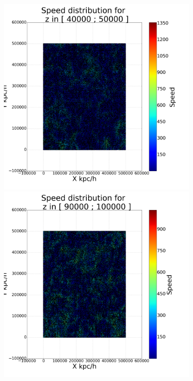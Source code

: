 \documentclass[12pt]{article}
\begin{document}

\begin{figure}[ht]
\centering
\begin{minipage}{.45\textwidth}
  \centering
  \includegraphics[width=0.9\textwidth]{graphs/scatter_magnitud_vel50000.png}
\end{minipage}%
\begin{minipage}{.45\textwidth}
  \centering
  \includegraphics[width=0.9\textwidth]{graphs/scatter_magnitud_vel100000.png}

\end{minipage}
\end{figure}
\end{document}
